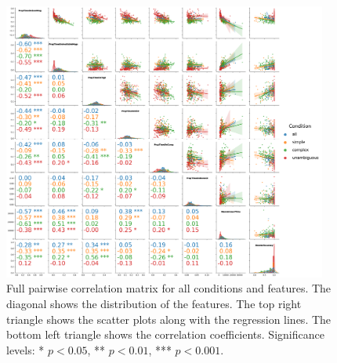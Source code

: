 \begin{figure}
    \centering
    \includegraphics[width=0.95\textwidth]{images/pairwise_corr.png}
    \caption{Full pairwise correlation matrix for all conditions and features. The diagonal shows the distribution of the features. The top right triangle shows the scatter plots along with the regression lines. The bottom left triangle shows the correlation coefficients. Significance levels: * $p < 0.05$, ** $p < 0.01$, *** $p < 0.001$.}
    \label{fig:pairwise_corr_full}
\end{figure}